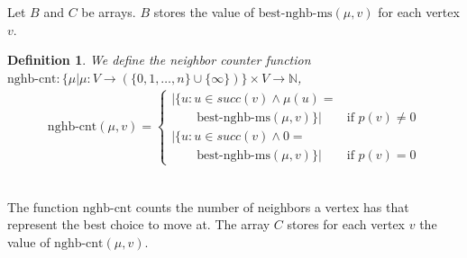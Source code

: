 \documentclass[12pt,oneside,bibliography=totoc,abstracton]{scrartcl}
\newtheorem{mydef}{Definition}
\begin{document}
Let $B$ and $C$ be arrays. $B$ stores the value of $\text{best-nghb-ms}(\mu, v)$ for each vertex $v$.
\begin{mydef}
	We define the \textnormal{neighbor counter function} $\text{nghb-cnt}:
	\{\mu | \mu: V \to (\{0, 1, \ldots, n\} \cup \{\infty\})\} \times V \to \mathbb{N}$,
	\begin{align*}
		\text{nghb-cnt}(\mu, v) = \begin{cases}|\{u : u \in succ(v) \land \mu(u) =\\
								\qquad\text{best-nghb-ms}(\mu, v)\}| & \text{if } p(v) \ne 0\\
							|\{u : u \in succ(v) \land 0 =\\
								\qquad\text{best-nghb-ms}(\mu, v)\}| & \text{if } p(v) = 0
						\end{cases}
	\end{align*}
\end{mydef}\quad\\
The function $\text{nghb-cnt}$ counts the number of neighbors a vertex has that represent the best choice to move at.
The array $C$ stores for each vertex $v$ the value of $\text{nghb-cnt}(\mu, v)$.

\end{document}
